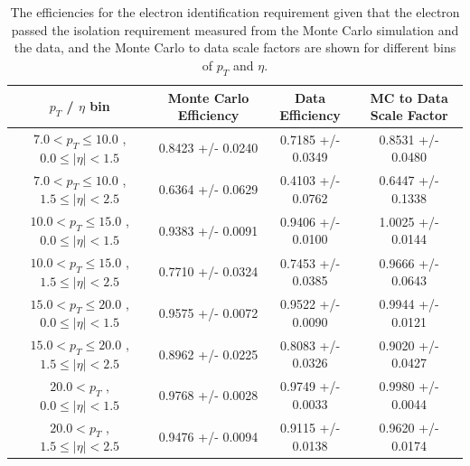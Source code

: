 \documentclass{cmspaper}
\begin{document}
 \begin{table}[!ht]
 \begin{center} 
 \begin{tabular}{|c|c|c|c|}
 \hline
 $p_{T}$ / $\eta$ bin    &  Monte Carlo Efficiency    &  Data Efficiency   &  MC to Data Scale Factor \\   \hline           
$  7.0 < p_{T} \le  10.0$ , $  0.0  \le |\eta| <   1.5$   &       0.8423 +/- 0.0240   &       0.7185 +/- 0.0349   &       0.8531 +/- 0.0480   \\   
\hline
$  7.0 < p_{T} \le  10.0$ , $  1.5  \le |\eta| <   2.5$   &       0.6364 +/- 0.0629   &       0.4103 +/- 0.0762   &       0.6447 +/- 0.1338   \\   
\hline
$ 10.0 < p_{T} \le  15.0$ , $  0.0  \le |\eta| <   1.5$   &       0.9383 +/- 0.0091   &       0.9406 +/- 0.0100   &       1.0025 +/- 0.0144   \\   
\hline
$ 10.0 < p_{T} \le  15.0$ , $  1.5  \le |\eta| <   2.5$   &       0.7710 +/- 0.0324   &       0.7453 +/- 0.0385   &       0.9666 +/- 0.0643   \\   
\hline
$ 15.0 < p_{T} \le  20.0$ , $  0.0  \le |\eta| <   1.5$   &       0.9575 +/- 0.0072   &       0.9522 +/- 0.0090   &       0.9944 +/- 0.0121   \\   
\hline
$ 15.0 < p_{T} \le  20.0$ , $  1.5  \le |\eta| <   2.5$   &       0.8962 +/- 0.0225   &       0.8083 +/- 0.0326   &       0.9020 +/- 0.0427   \\   
\hline
$ 20.0 < p_{T} $ , $  0.0  \le |\eta| <   1.5$   &       0.9768 +/- 0.0028   &       0.9749 +/- 0.0033   &       0.9980 +/- 0.0044   \\   
\hline
$ 20.0 < p_{T} $ , $  1.5  \le |\eta| <   2.5$   &       0.9476 +/- 0.0094   &       0.9115 +/- 0.0138   &       0.9620 +/- 0.0174   \\   
\hline
\end{tabular}
\caption{The efficiencies for the electron identification requirement given that the electron passed
  the isolation requirement measured from the Monte Carlo simulation and the data, and the Monte Carlo
to data scale factors are shown for different bins of $p_{T}$ and $\eta$. }
\label{tab:Efficiency_HZZICHEP2012IDGivenIso}
\end{center}
\end{table}
\end{document}
